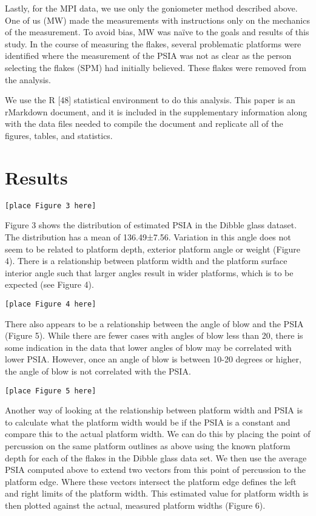 \documentclass[10pt,letterpaper]{article}
\begin{document}
Lastly, for the MPI data, we use only the goniometer method described
above. One of us (MW) made the measurements with instructions only on
the mechanics of the measurement. To avoid bias, MW was naïve to the
goals and results of this study. In the course of measuring the flakes,
several problematic platforms were identified where the measurement of
the PSIA was not as clear as the person selecting the flakes (SPM) had
initially believed. These flakes were removed from the analysis.

We use the R {[}48{]} statistical environment to do this analysis. This
paper is an rMarkdown document, and it is included in the supplementary
information along with the data files needed to compile the document and
replicate all of the figures, tables, and statistics.

\hypertarget{results}{%
\section{Results}\label{results}}

\begin{verbatim}
[place Figure 3 here]
\end{verbatim}

Figure 3 shows the distribution of estimated PSIA in the Dibble glass
dataset. The distribution has a mean of 136.49±7.56. Variation in this
angle does not seem to be related to platform depth, exterior platform
angle or weight (Figure 4). There is a relationship between platform
width and the platform surface interior angle such that larger angles
result in wider platforms, which is to be expected (see Figure 4).

\begin{verbatim}
[place Figure 4 here]
\end{verbatim}

There also appears to be a relationship between the angle of blow and
the PSIA (Figure 5). While there are fewer cases with angles of blow
less than 20, there is some indication in the data that lower angles of
blow may be correlated with lower PSIA. However, once an angle of blow
is between 10-20 degrees or higher, the angle of blow is not correlated
with the PSIA.

\begin{verbatim}
[place Figure 5 here]
\end{verbatim}

Another way of looking at the relationship between platform width and
PSIA is to calculate what the platform width would be if the PSIA is a
constant and compare this to the actual platform width. We can do this
by placing the point of percussion on the same platform outlines as
above using the known platform depth for each of the flakes in the
Dibble glass data set. We then use the average PSIA computed above to
extend two vectors from this point of percussion to the platform edge.
Where these vectors intersect the platform edge defines the left and
right limits of the platform width. This estimated value for platform
width is then plotted against the actual, measured platform widths
(Figure 6).
\end{document}
